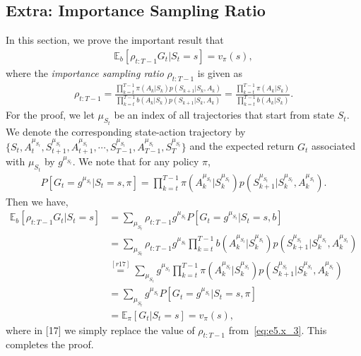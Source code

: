 \documentclass[10pt]{article}
\begin{document}
 	\subsection*{Extra: Importance Sampling Ratio}
 	\label{ex:imps-ratio}
 	\newcommand{\m}{\mu_{S_t}}
 	In this section, we prove the important result that 
 	\begin{align*}
 	\mathbb{E}_b \left[ \rho_{t:T-1} G_t | S_t = s \right] = v_\pi(s),
 	\end{align*}
 	where the \emph{importance sampling ratio} $\rho_{t:T-1}$ is given as
 	\begin{align}
 	\label{eq:e5.x_3}
 	\rho_{t:T-1} = \frac{ \prod_{k=t}^{T-1} \pi(A_k | S_k ) p(S_{k+1}|S_k,A_k)}{ \prod_{k=t}^{T-1} b(A_k | S_k ) p(S_{k+1}|S_k,A_k)} = \frac{ \prod_{k=t}^{T-1} \pi(A_k | S_k )}{ \prod_{k=t}^{T-1} b(A_k | S_k ) }.
 	\end{align}
 	For the proof, we let $\m$ be an index of all trajectories that start from state $S_t$. We denote the corresponding state-action trajectory by $\{ S_t, A^{\m}_t, S^{\m}_{t+1},A^{\m}_{t+1},\cdots, S^{\m}_{T-1},A^{\m}_{T-1},S^{\m}_T\}$ and the expected return $G_t$ associated with $\m$ by $g^{\m}$. We note that for any policy $\pi$,
 	\begin{align*}
 	P [G_t = g^{\m} | S_t = s, \pi] = \prod_{k=t}^{T-1} \pi(A^{\m}_k | S^{\m}_k) p(S^{\m}_{k+1}|S^{\m}_k,A^{\m}_k).
 	\end{align*}
 	Then we have,
 	\begin{align*}
 	\mathbb{E}_b \left[ \rho_{t:T-1} G_t | S_t = s\right] &= \sum_{\m} \rho_{t:T-1} g^{\m} P[G_t = g^{\m} | S_t = s,b]\\
 	&= \sum_{\m} \rho_{t:T-1} g^{\m}  \prod_{k=t}^{T-1} b(A^{\m}_k | S^{\m}_k) p(S^{\m}_{k+1}|S^{\m}_k,A^{\m}_k)\\
 	&\stackrel{[r17]}{=} \sum_{\m} g^{\m}  \prod_{k=t}^{T-1} \pi(A^{\m}_k | S^{\m}_k) p(S^{\m}_{k+1}|S^{\m}_k,A^{\m}_k)\\
 	&= \sum_{\m} g^{\m} P[G_t = g^{\m} | S_t = s,\pi]\\
 	&= \mathbb{E}_\pi \left[ G_t | S_t = s \right] = v_\pi(s),
 	\end{align*}
 	where in [17] we simply replace the value of $\rho_{t:T-1}$  from~\eqref{eq:e5.x_3}. This completes the proof.
\end{document}
